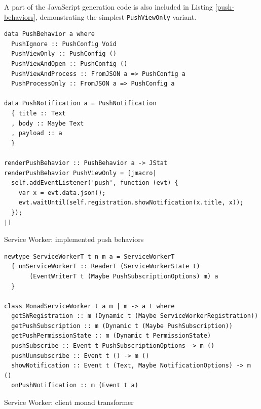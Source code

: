 \documentclass[english,zadani,odsaz]{fitthesis}
\begin{document}
A part of the JavaScript generation code is also included in Listing
\ref{push-behaviors}, demonstrating the simplest \texttt{PushViewOnly} variant.

\begin{listing}[p]
\begin{verbatim}
data PushBehavior a where
  PushIgnore :: PushConfig Void
  PushViewOnly :: PushConfig ()
  PushViewAndOpen :: PushConfig ()
  PushViewAndProcess :: FromJSON a => PushConfig a
  PushProcessOnly :: FromJSON a => PushConfig a

data PushNotification a = PushNotification
  { title :: Text
  , body :: Maybe Text
  , payload :: a
  }

renderPushBehavior :: PushBehavior a -> JStat
renderPushBehavior PushViewOnly = [jmacro|
  self.addEventListener('push', function (evt) {
    var x = evt.data.json();
    evt.waitUntil(self.registration.showNotification(x.title, x));
  });
|]
\end{verbatim}
\caption{Service Worker: implemented push behaviors \label{push-behaviors}}
\end{listing}

\begin{listing}[p]
\begin{verbatim}
newtype ServiceWorkerT t n m a = ServiceWorkerT
  { unServiceWorkerT :: ReaderT (ServiceWorkerState t)
       (EventWriterT t (Maybe PushSubscriptionOptions) m) a
  }

class MonadServiceWorker t a m | m -> a t where
  getSWRegistration :: m (Dynamic t (Maybe ServiceWorkerRegistration))
  getPushSubscription :: m (Dynamic t (Maybe PushSubscription))
  getPushPermissionState :: m (Dynamic t PermissionState)
  pushSubscribe :: Event t PushSubscriptionOptions -> m ()
  pushUunsubscribe :: Event t () -> m ()
  showNotification :: Event t (Text, Maybe NotificationOptions) -> m ()
  onPushNotification :: m (Event t a)
\end{verbatim}
\caption{Service Worker: client monad transformer \label{sw-client-mtl}}
\end{listing}
\end{document}
